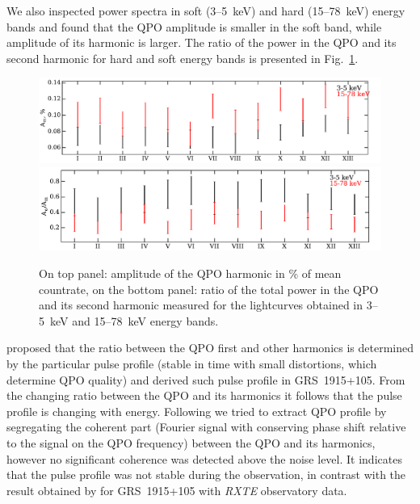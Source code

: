 \documentclass[a4paper,fleqn,usenatbib]{mnras}
\begin{document}
We also inspected power spectra in soft (3--5~keV) and hard (15--78~keV) energy bands and found that the QPO amplitude is smaller in the soft band, while amplitude of its harmonic is larger.
The ratio of the power in the QPO and its second harmonic for hard and soft energy bands is presented in Fig.~\ref{fig:qpo_ratio}.
\begin{figure}
\includegraphics[width=\columnwidth]{qpo_amplitude.pdf}
\includegraphics[width=\columnwidth]{QPO_and_harmonic_ratio_ylabel.pdf}
        \caption{On top panel: amplitude of the QPO harmonic in \% of mean countrate, on the bottom panel: ratio of the total power in the QPO and its second harmonic measured for the lightcurves obtained in 3--5~keV and 15--78~keV energy bands.}
        \label{fig:qpo_ratio}
\end{figure}
\citet{2015MNRAS.446.3516I} proposed that the ratio between the QPO first and other harmonics is determined by the particular pulse profile (stable in time with small distortions, which determine QPO quality) and derived such pulse profile in GRS~1915+105.
From the changing ratio between the QPO and its harmonics it follows that the pulse profile is changing with energy. 
Following \citet{2015MNRAS.446.3516I} we tried to extract QPO profile by segregating the coherent part (Fourier signal with conserving phase shift relative to the signal on the QPO frequency) between the QPO and its harmonics, however no significant coherence was detected above the noise level.
It indicates that the pulse profile was not stable during the observation, in contrast with the result obtained by \citet{2015MNRAS.446.3516I} for GRS~1915+105 with {\it RXTE} observatory data.
\end{document}
